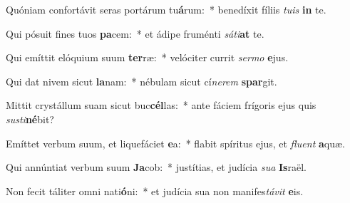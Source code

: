 \item Quóniam confortávit seras portárum tu\textbf{á}rum:~* benedíxit fíliis \textit{tu}\textit{is} \textbf{in} te.
\item Qui pósuit fines tuos \textbf{pa}cem:~* et ádipe fruménti \textit{sá}\textit{ti}\textbf{at} te.
\item Qui emíttit elóquium suum \textbf{ter}ræ:~* velóciter currit \textit{ser}\textit{mo} \textbf{e}jus.
\item Qui dat nivem sicut \textbf{la}nam:~* nébulam sicut cí\textit{ne}\textit{rem} \textbf{spar}git.
\item Mittit crystállum suam sicut buc\textbf{cél}las:~* ante fáciem frígoris ejus quis \textit{sus}\textit{ti}\textbf{né}bit?
\item Emíttet verbum suum, et liquefáciet \textbf{e}a:~* flabit spíritus ejus, et \textit{flu}\textit{ent} \textbf{a}quæ.
\item Qui annúntiat verbum suum \textbf{Ja}cob:~* justítias, et judícia \textit{su}\textit{a} \textbf{Is}raël.
\item Non fecit táliter omni nati\textbf{ó}ni:~* et judícia sua non manifes\textit{tá}\textit{vit} \textbf{e}is.
